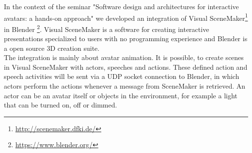 \documentclass[
10pt, %
a4paper, %
oneside,
headinclude,footinclude, %
BCOR 0mm, %
]{scrartcl}
\begin{document}
In the context of the seminar "Software design and architectures for interactive avatars: a hands-on approach" we developed an integration of Visual SceneMaker\footnote{\url{http://scenemaker.dfki.de/}} in Blender \footnote{\url{https://www.blender.org/}}.
Visual SceneMaker is a software for creating interactive presentations specialized to users with no programming experience and Blender is a open source 3D creation suite.\\
The integration is mainly about avatar animation. It is possible, to create scenes in Visual SceneMaker with actors, speeches and actions. These defined action and speech activities will be sent via a UDP socket connection to Blender, in which actors perform the actions whenever a message from SceneMaker is retrieved. An actor can be an avatar itself or objects in the environment, for example a light that can be turned on, off or dimmed.
\end{document}
